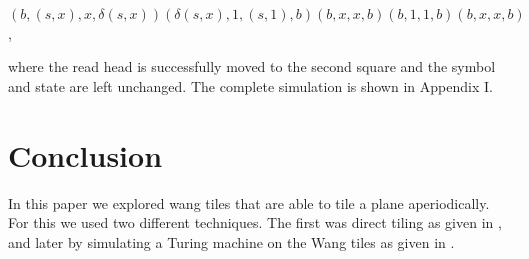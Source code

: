 \documentclass{article}
\begin{document}
$ (b, (s,x), x, \delta(s,x)) (\delta(s,x), 1, (s,1), b) (b, x, x, b) (b, 1, 1, b) (b, x, x, b) $, 

where the read head is successfully moved to the second square and the symbol and state are left unchanged. The complete simulation is shown in Appendix I. 


\section*{Conclusion}
In this paper we explored wang tiles that are able to tile a plane aperiodically. For this we used two different techniques. The first was direct tiling as given in \cite{tilings}, and later by simulating a Turing machine on the Wang tiles as given in \cite{tmtiles}.

\end{document}
